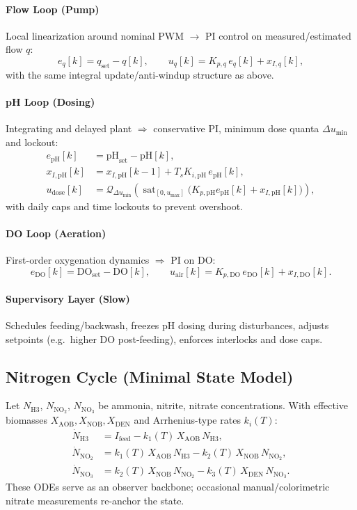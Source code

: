 \documentclass[11pt,a4paper]{article}
\begin{document}
	\paragraph{Flow Loop (Pump)}
	Local linearization around nominal PWM $\to$ PI control on measured/estimated flow $q$:
	$$
	e_q[k] = q_{\text{set}} - q[k],\qquad u_q[k] = K_{p,q}\,e_q[k] + x_{I,q}[k],
	$$
	with the same integral update/anti-windup structure as above.
	
	\paragraph{pH Loop (Dosing)}
	Integrating and delayed plant $\Rightarrow$ conservative PI, minimum dose quanta $\Delta u_{\min}$ and lockout:
	$$
	\begin{aligned}
		e_{\text{pH}}[k] &= \text{pH}_{\text{set}} - \text{pH}[k],\\
		x_{I,\text{pH}}[k] &= x_{I,\text{pH}}[k{-}1] + T_s K_{i,\text{pH}}\,e_{\text{pH}}[k],\\
		u_{\text{dose}}[k] &= \mathcal{Q}_{\Delta u_{\min}}\!\left(\operatorname{sat}_{[0,u_{\max}]}\big(K_{p,\text{pH}}e_{\text{pH}}[k] + x_{I,\text{pH}}[k]\big)\right),
	\end{aligned}
	$$
	with daily caps and time lockouts to prevent overshoot.
	
	\paragraph{DO Loop (Aeration)}
	First-order oxygenation dynamics $\Rightarrow$ PI on DO:
	$$
	e_{\text{DO}}[k] = \text{DO}_{\text{set}} - \text{DO}[k],\qquad u_{\text{air}}[k] = K_{p,\text{DO}}\,e_{\text{DO}}[k] + x_{I,\text{DO}}[k].
	$$
	
	\paragraph{Supervisory Layer (Slow)}
	Schedules feeding/backwash, freezes pH dosing during disturbances, adjusts setpoints (e.g.\ higher DO post-feeding), enforces interlocks and dose caps.
	
	\subsection*{Nitrogen Cycle (Minimal State Model)}
	Let $N_{\mathrm{H3}}$, $N_{\mathrm{NO_2}}$, $N_{\mathrm{NO_3}}$ be ammonia, nitrite, nitrate concentrations. With effective biomasses $X_{\mathrm{AOB}},X_{\mathrm{NOB}},X_{\mathrm{DEN}}$ and Arrhenius-type rates $k_i(T)$:
	$$
	\begin{aligned}
		\dot N_{\mathrm{H3}}   &= I_{\text{feed}} - k_1(T)\,X_{\mathrm{AOB}}\,N_{\mathrm{H3}},\\
		\dot N_{\mathrm{NO_2}} &= k_1(T)\,X_{\mathrm{AOB}}\,N_{\mathrm{H3}} - k_2(T)\,X_{\mathrm{NOB}}\,N_{\mathrm{NO_2}},\\
		\dot N_{\mathrm{NO_3}} &= k_2(T)\,X_{\mathrm{NOB}}\,N_{\mathrm{NO_2}} - k_3(T)\,X_{\mathrm{DEN}}\,N_{\mathrm{NO_3}}.
	\end{aligned}
	$$
	These ODEs serve as an observer backbone; occasional manual/colorimetric nitrate measurements re-anchor the state.
	
\end{document}
